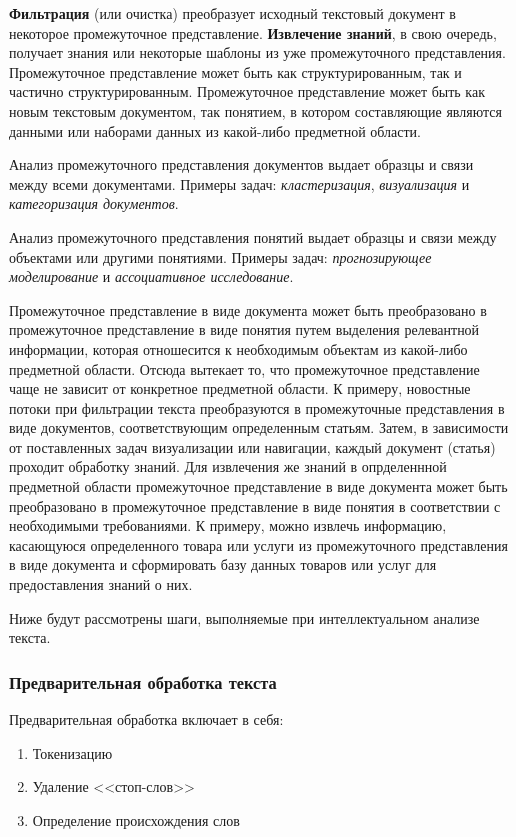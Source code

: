 \documentclass[14pt]{matmex-diploma-custom}
\begin{document}
\textbf{Фильтрация} (или очистка) преобразует исходный текстовый документ в некоторое промежуточное представление. \textbf{Извлечение знаний}, в свою очередь, получает знания или некоторые шаблоны из уже промежуточного представления. Промежуточное представление может быть как структурированным, так и частично структурированным. Промежуточное представление может быть как новым текстовым документом, так понятием, в котором составляющие являются данными или наборами данных из какой-либо предметной области.

Анализ промежуточного представления документов выдает образцы и связи между всеми документами. Примеры задач: \emph{кластеризация}, \emph{визуализация} и \emph{категоризация документов}.

Анализ промежуточного представления понятий выдает образцы и связи между объектами или другими понятиями. Примеры задач: \emph{прогнозирующее моделирование} и \emph{ассоциативное исследование}.

Промежуточное представление в виде документа может быть преобразовано в промежуточное представление в виде понятия путем выделения релевантной информации, которая отношесится к необходимым объектам из какой-либо предметной области. Отсюда вытекает то, что промежуточное представление чаще не зависит от конкретное предметной области. К примеру, новостные потоки при фильтрации текста преобразуются в промежуточные представления в виде документов, соответствующим определенным статьям. Затем, в зависимости от поставленных задач визуализации или навигации, каждый документ (статья) проходит обработку знаний. Для извлечения же знаний в опрделеннной предметной области промежуточное представление в виде документа может быть преобразовано в промежуточное представление в виде понятия в соответствии с необходимыми требованиями. К примеру, можно извлечь информацию, касающуюся определенного товара или услуги из промежуточного представления в виде документа и сформировать базу данных товаров или услуг для предоставления знаний о них.

Ниже будут рассмотрены шаги, выполняемые при интеллектуальном анализе текста.

\subsubsection{Предварительная обработка текста}

Предварительная обработка включает в себя:

\begin{enumerate}
\item Токенизацию
\item Удаление <<стоп-слов>>
\item Определение происхождения слов
\end{enumerate}
\end{document}
